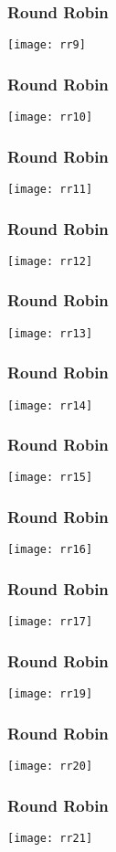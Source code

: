 \begin{frame}
\frametitle{Round Robin}
\texttt{[image: rr9]}
\end{frame}

\begin{frame}
\frametitle{Round Robin}
\texttt{[image: rr10]}
\end{frame}

\begin{frame}
\frametitle{Round Robin}
\texttt{[image: rr11]}
\end{frame}

\begin{frame}
\frametitle{Round Robin}
\texttt{[image: rr12]}
\end{frame}

\begin{frame}
\frametitle{Round Robin}
\texttt{[image: rr13]}
\end{frame}

\begin{frame}
\frametitle{Round Robin}
\texttt{[image: rr14]}
\end{frame}

\begin{frame}
\frametitle{Round Robin}
\texttt{[image: rr15]}
\end{frame}

\begin{frame}
\frametitle{Round Robin}
\texttt{[image: rr16]}
\end{frame}

\begin{frame}
\frametitle{Round Robin}
\texttt{[image: rr17]}
\end{frame}

\begin{frame}
\frametitle{Round Robin}
\texttt{[image: rr19]}
\end{frame}

\begin{frame}
\frametitle{Round Robin}
\texttt{[image: rr20]}
\end{frame}

\begin{frame}
\frametitle{Round Robin}
\texttt{[image: rr21]}
\end{frame}

